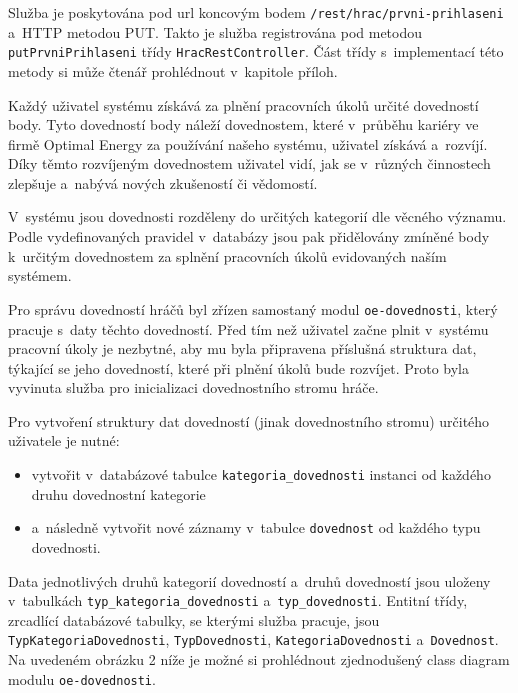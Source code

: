 \documentclass[12pt]{article}
\begin{document}
Služba je poskytována pod url koncovým bodem \texttt{/rest/hrac/prvni-prihlaseni} a~HTTP metodou PUT.  Takto je služba registrována pod metodou \texttt{putPrvniPrihlaseni} třídy \texttt{HracRestController}.
Část třídy s~implementací této metody si může čtenář prohlédnout v~kapitole příloh.

\clearpage


Každý uživatel systému získává za plnění pracovních úkolů určité dovedností body. Tyto dovedností body náleží dovednostem, které v~průběhu kariéry ve firmě Optimal Energy za používání našeho systému, uživatel získává a~rozvíjí. Díky těmto rozvíjeným dovednostem uživatel vidí, jak se v~různých činnostech zlepšuje a~nabývá nových zkušeností či vědomostí. 

V~systému jsou dovednosti rozděleny do určitých kategorií dle věcného významu. Podle vydefinovaných pravidel v~databázy jsou pak přidělovány zmíněné body k~určitým dovednostem za splnění pracovních úkolů evidovaných naším systémem.

Pro správu dovedností hráčů byl zřízen samostaný modul \texttt{oe-dovednosti}, který pracuje s~daty těchto dovedností. Před tím než uživatel začne plnit v~systému pracovní úkoly je nezbytné, aby mu byla připravena příslušná struktura dat, týkající se jeho dovedností, které při plnění úkolů bude rozvíjet. Proto byla vyvinuta služba pro inicializaci dovednostního stromu hráče.


Pro vytvoření struktury dat dovedností (jinak dovednostního stromu) určitého uživatele je nutné:

\begin{itemize}

\item vytvořit v~databázové tabulce \texttt{kategoria\_dovednosti} instanci od každého druhu dovednostní kategorie
\item  a~následně vytvořit nové záznamy v~tabulce \texttt{dovednost} od každého typu dovednosti.
\end{itemize}

Data jednotlivých druhů kategorií dovedností a~druhů dovedností jsou uloženy v~tabulkách \texttt{typ\_kategoria\_dovednosti} a~\texttt{typ\_dovednosti}.
Entitní třídy, zrcadlící databázové tabulky, se kterými služba pracuje, jsou \texttt{TypKategoriaDovednosti}, \texttt{TypDovednosti}, \texttt{KategoriaDovednosti} a~\texttt{Dovednost}. Na uvedeném obrázku 2 níže je možné si prohlédnout zjednodušený class diagram modulu \texttt{oe-dovednosti}. 
\end{document}
